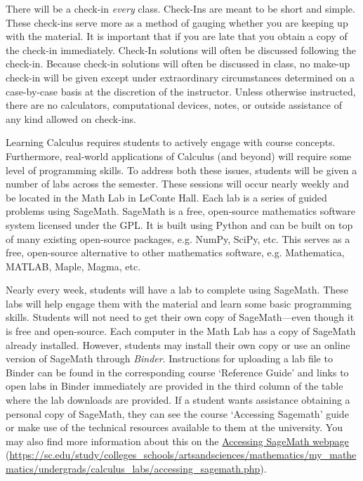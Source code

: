\documentclass[11pt,letterpaper]{article}
\begin{document}
There will be a check-in \textit{every} class. Check-Ins are meant to be short and simple. These check-ins serve more as a method of gauging whether you are keeping up with the material. It is important that if you are late that you obtain a copy of the check-in immediately. Check-In solutions will often be discussed following the check-in. Because check-in solutions will often be discussed in class, no make-up check-in will be given except under extraordinary circumstances determined on a case-by-case basis at the discretion of the instructor. Unless otherwise instructed, there are no calculators, computational devices, notes, or outside assistance of any kind allowed on check-ins. 
\sectionbreak



Learning Calculus requires students to actively engage with course concepts. Furthermore, real-world applications of Calculus (and beyond) will require some level of programming skills. To address both these issues, students will be given a number of labs across the semester. These sessions will occur nearly weekly and be located in the Math Lab in LeConte Hall. Each lab is a series of guided problems using SageMath. SageMath is a free, open-source mathematics software system licensed under the GPL. It is built using Python and can be built on top of many existing open-source packages, e.g. NumPy, SciPy, etc. This serves as a free, open-source alternative to other mathematics software, e.g. Mathematica, MATLAB, Maple, Magma, etc. \pspace

Nearly every week, students will have a lab to complete using SageMath. These labs will help engage them with the material and learn some basic programming skills. Students will not need to get their own copy of SageMath---even though it is free and open-source. Each computer in the Math Lab has a copy of SageMath already installed. However, students may install their own copy or use an online version of SageMath through \textit{Binder}. Instructions for uploading a lab file to Binder can be found in the corresponding course `Reference Guide' and links to open labs in Binder immediately are provided in the third column of the table where the lab downloads are provided. If a student wants assistance obtaining a personal copy of SageMath, they can see the course `Accessing Sagemath' guide or make use of the technical resources available to them at the university. You may also find more information about this on the \href{https://sc.edu/study/colleges\_schools/artsandsciences/mathematics/my\_mathematics/undergrads/calculus\_labs/accessing\_sagemath.php}{Accessing SageMath webpage} (\url{https://sc.edu/study/colleges\_schools/artsandsciences/mathematics/my\_mathematics/undergrads/calculus\_labs/accessing\_sagemath.php}). \pspace
\end{document}
